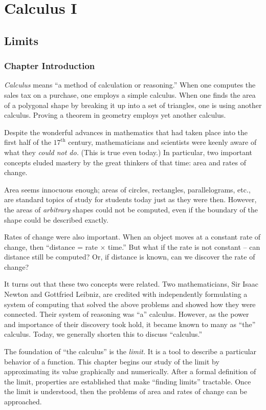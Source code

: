 \part{Calculus I}

\chapter{Limits}\label{chapter:limits}
\thispagestyle{empty}
\iflatexml\section*{Chapter Introduction}\fi

\textit{Calculus} means ``a method of calculation or reasoning.'' When one computes the sales tax on a purchase, one employs a simple calculus. When one finds the area of a polygonal shape by breaking it up into a set of triangles, one is using another calculus. Proving a theorem in geometry employs yet another calculus.

Despite the wonderful advances in mathematics that had taken place into the first half of the $17^\text{th}$ century, mathematicians and scientists were keenly aware of what they \textit{could not do.} (This is true even today.) In particular, two important concepts eluded mastery by the great thinkers of that time: area and rates of change. 

Area seems innocuous enough; areas of circles, rectangles, parallelograms, etc., are standard topics of study for students today just as they were then. However, the areas of \textit{arbitrary} shapes could not be computed, even if the boundary of the shape could be described exactly. 

Rates of change were also important. When an object moves at a constant rate of change, then ``distance = rate $\times $ time.'' But what if the rate is not constant -- can distance still be computed? Or, if distance is known, can we discover the rate of change?

It turns out that these two concepts were related. Two mathematicians, Sir Isaac Newton and Gottfried Leibniz, are credited with independently formulating a system of computing that solved the above problems and showed how they were connected. Their system of reasoning was ``a'' calculus. However, as the power and importance of their discovery took hold, it became known to many as ``the'' calculus. Today, we generally shorten this to discuss ``calculus.''

The foundation of ``the calculus'' is the \textit{limit.} It is a tool to describe a particular behavior of a function. This chapter begins our study of the limit by approximating its value graphically and numerically. After a formal definition of the limit, properties are established that make ``finding limits'' tractable. Once the limit is understood, then the problems of area and rates of change can be approached.









